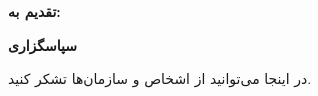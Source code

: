 \thispagestyle{empty}

\noindent
\textbf{\Large تقدیم به:}
\vskip 1cm

\newpage
\thispagestyle{empty}

\begin{center}
\textbf{\Large سپاسگزاری}
\end{center}
\vskip 1cm
\noindent در اینجا می‌توانید از اشخاص و سازمان‌ها تشکر کنید.

\vskip 1cm
